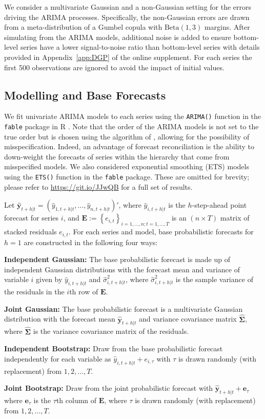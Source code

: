 \documentclass[a4paper,12pt]{article}
\theoremstyle{definition}
\begin{document}
We consider a multivariate Gaussian and a non-Gaussian setting for the errors driving the ARIMA processes. Specifically, the non-Gaussian errors are drawn from a meta-distribution of a Gumbel copula with $\text{Beta}(1,3)$ margins. After simulating from the ARIMA models, additional noise is added to ensure bottom-level series have a lower signal-to-noise ratio than bottom-level series with details provided in Appendix~\ref{app:DGP} of the online supplement. For each series the first 500 observations are ignored to avoid the impact of initial values.


\subsection{Modelling and Base Forecasts}

We fit univariate ARIMA models to each series using the \verb|ARIMA()| function in the \verb|fable| package \citep{Rfable} in R \citep{Rcore}. Note that the order of the ARIMA models is not set to the true order but is chosen using the algorithm of \cite{HynKha2008}, allowing for the possibility of misspecification. Indeed, an advantage of forecast reconciliation is the ability to down-weight the forecasts of series within the hierarchy that come from misspecified models. We also considered exponential smoothing (ETS) models using the \verb|ETS()| function in the \verb|fable| package. These are omitted for brevity; please refer to \url{https://git.io/JJwQB} for a full set of results.

Let $\hat{\bm{y}}_{t+h|t}=\left(\hat{y}_{1,t+h|t},\ldots,\hat{y}_{n,t+h|t}\right)'$, where $\hat{y}_{i,t+h|t}$ is the $h$-step-ahead point forecast for series $i$, and $\bm{E}:=\left\{e_{i,t}\right\}_{i=1,\dots,n;t=1,\dots,T}$ is an $(n \times T)$ matrix of stacked residuals $e_{i,t}$. For each series and model, base probabilistic forecasts for $h=1$ are constructed in the following four ways:
\begin{compactitem}
	\item \textbf{Independent Gaussian:} The base probabilistic forecast is made up of independent Gaussian distributions with the forecast mean and variance of variable $i$ given by $\hat{y}_{i,t+h|t}$ and $\hat{\sigma}^2_{i,t+h|t}$, where $\hat{\sigma}^2_{i,t+h|t}$ is the sample variance of the residuals in the $i$th row of $\bm{E}$.
	\item \textbf{Joint Gaussian:} The base probabilistic forecast is a multivariate Gaussian distribution with the forecast mean $\hat{\bm{y}}_{t+h|t}$ and variance covariance matrix $\hat{\bm\Sigma}$, where $\hat{\bm\Sigma}$ is the variance covariance matrix of the residuals.
	\item \textbf{Independent Bootstrap:} Draw from the base probabilistic forecast independently for each variable as $\hat{y}_{i,t+h|t}+e_{i,\tau}$ with $\tau$ is drawn randomly (with replacement) from $1,2,\ldots, T$.
	\item \textbf{Joint Bootstrap:} Draw from the joint probabilistic forecast with $\hat{\bm{y}}_{t+h|t}+\bm{e}_{\tau}$ where $\bm{e}_{\tau}$ is the $\tau$th column of $\bm{E}$, where $\tau$ is drawn randomly (with replacement) from $1,2,\ldots, T$.
\end{compactitem}
\end{document}
